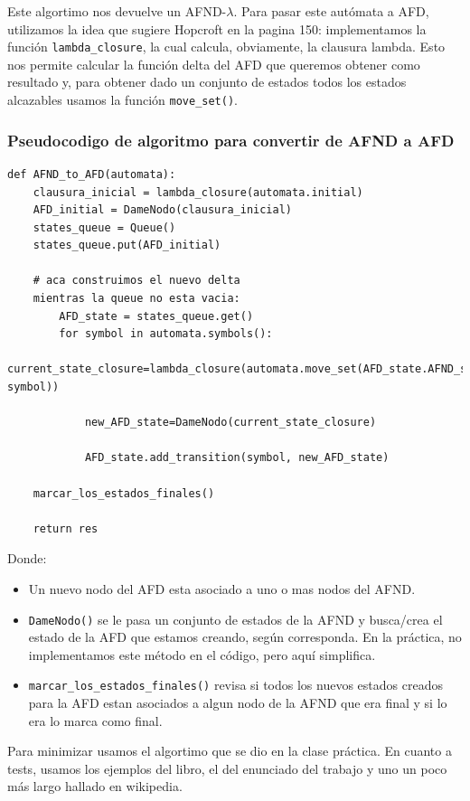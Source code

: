 \documentclass{article}
\begin{document}
Este algortimo nos devuelve un AFND-$\lambda$.  Para pasar este autómata a AFD, utilizamos la idea que sugiere Hopcroft en la pagina 150: implementamos la función \texttt{lambda\_closure}, la cual calcula, obviamente, la clausura lambda.  Esto nos permite calcular la función delta del AFD que queremos obtener como resultado y, para obtener dado un conjunto de estados todos los estados alcazables usamos la función \texttt{move\_set()}.

\subsubsection*{Pseudocodigo de algoritmo para convertir de AFND a AFD}

\begin{verbatim}
def AFND_to_AFD(automata):
    clausura_inicial = lambda_closure(automata.initial)
    AFD_initial = DameNodo(clausura_inicial)
    states_queue = Queue()
    states_queue.put(AFD_initial)
    
    # aca construimos el nuevo delta
    mientras la queue no esta vacia:
        AFD_state = states_queue.get()
        for symbol in automata.symbols():
            current_state_closure=lambda_closure(automata.move_set(AFD_state.AFND_states, symbol))

            new_AFD_state=DameNodo(current_state_closure)
            
            AFD_state.add_transition(symbol, new_AFD_state)

    marcar_los_estados_finales()

    return res
\end{verbatim}

\pagebreak
Donde:
\begin{itemize}
\item Un nuevo nodo del AFD esta asociado a uno o mas nodos del AFND.
\item \texttt{DameNodo()} se le pasa un conjunto de estados de la AFND y busca/crea el estado de la AFD que estamos creando, según corresponda.  En la práctica, no implementamos este método en el código, pero aquí simplifica.
\item \texttt{marcar\_los\_estados\_finales()} revisa si todos los nuevos estados creados para la AFD estan asociados a algun nodo de la AFND que era final y si lo era lo marca como final.
\end{itemize}

Para minimizar usamos el algortimo que se dio en la clase práctica. En cuanto a tests, usamos los ejemplos del libro, el del enunciado del trabajo y uno un poco más largo hallado en wikipedia.
\end{document}
